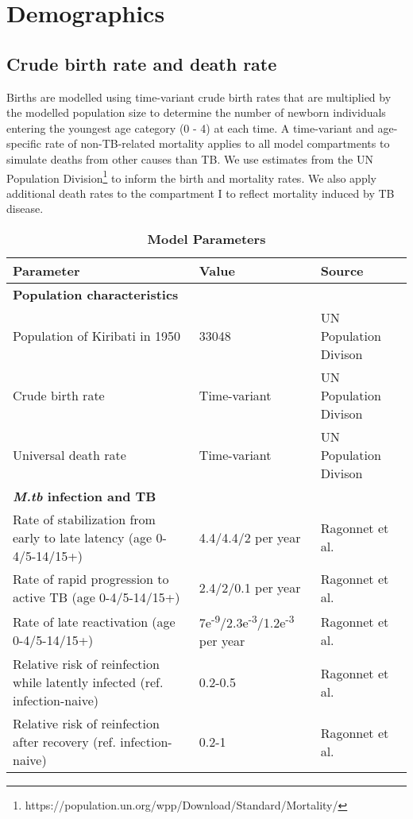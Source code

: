 

\section{Demographics}
\subsection{Crude birth rate and death rate}
Births are modelled using time-variant crude birth rates that are multiplied by the modelled population 
size to determine the number of newborn individuals entering the youngest age category (0 - 4) at each time. A time-variant 
and age-specific rate of non-TB-related mortality applies to all model compartments to simulate 
deaths from other causes than TB. We use estimates from the UN Population Division\footnote{https://population.un.org/wpp/Download/Standard/Mortality/} to inform the 
birth and mortality rates.
We also apply additional death rates to the compartment I to reflect mortality induced by TB 
disease.
\begin{table}[!htp]
    \caption{\textbf{Model Parameters}}
    \label{tab:parameter}
    \begin{threeparttable}
    \begin{tabularx}{\textwidth}{ X  X  X }
        \hline
        \textbf{Parameter} & \textbf{Value} & \textbf{Source} \\
        \hline
        \textbf{Population characteristics} & & \\
        Population of Kiribati in 1950 & 33048 & UN Population Divison \\
        Crude birth rate  & Time-variant & UN Population Divison \\
        Universal death rate & Time-variant & UN Population Divison \\
        \hline
        \textbf{\emph{M.tb} infection and TB} \\
        Rate of stabilization from early to late latency (age 0-4/5-14/15+) & 4.4/4.4/2 per year & Ragonnet et al.\cite{ragonnet-2022} \\
        Rate of rapid progression to active TB (age 0-4/5-14/15+) & 2.4/2/0.1 per year & Ragonnet et al.\cite{ragonnet-2022} \\
        Rate of late reactivation (age 0-4/5-14/15+) & 7e\textsuperscript{-9}/2.3e\textsuperscript{-3}/1.2e\textsuperscript{-3} per year & Ragonnet et al.\cite{ragonnet-2022} \\
        Relative risk of reinfection while latently infected (ref. infection-naive) & 0.2-0.5 & Ragonnet et al.\cite{ragonnet-2022} \\
        Relative risk of reinfection after recovery (ref. infection-naive) & 0.2-1 & Ragonnet et al.\cite{ragonnet-2022} \\
        \hline
	\end{tabularx}
    \end{threeparttable}
\end{table}
